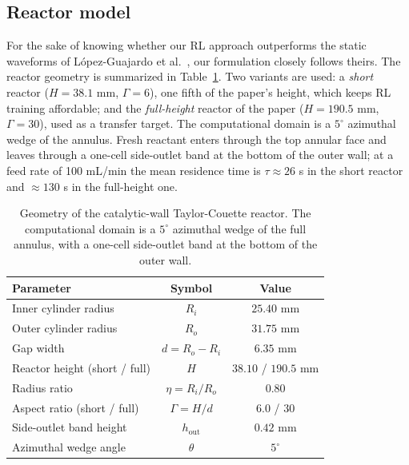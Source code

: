 \documentclass{article}
\begin{document}
\subsection{Reactor model}
For the sake of knowing whether our RL approach outperforms the static
waveforms of L\'opez-Guajardo et al.~\cite{lopez2024process}, our formulation
closely follows theirs. The reactor geometry is summarized in
Table~\ref{tab:geometry}. Two variants are used: a \emph{short} reactor
($H = 38.1$ mm, $\Gamma = 6$), one fifth of the paper's height, which keeps RL
training affordable; and the \emph{full-height} reactor of the paper
($H = 190.5$ mm, $\Gamma = 30$), used as a transfer target. The computational
domain is a $5^\circ$ azimuthal wedge of the annulus. Fresh reactant enters
through the top annular face and leaves through a one-cell side-outlet band at
the bottom of the outer wall; at a feed rate of 100 mL/min the mean residence
time is $\tau \approx 26$ s in the short reactor and $\approx 130$ s in the
full-height one.

\begin{table}[ht]
    \centering
    \caption{Geometry of the catalytic-wall Taylor-Couette reactor. The
    computational domain is a $5^\circ$ azimuthal wedge of the full annulus,
    with a one-cell side-outlet band at the bottom of the outer wall.\newline}\label{tab:geometry}
    \begin{tabular}{lcc}
        \toprule
        Parameter & Symbol & Value \\
        \midrule
        Inner cylinder radius   & $R_i$          & $25.40$ mm \\
        Outer cylinder radius   & $R_o$          & $31.75$ mm \\
        Gap width               & $d = R_o - R_i$ & $6.35$ mm \\
        Reactor height (short / full) & $H$      & $38.10$ / $190.5$ mm \\
        Radius ratio            & $\eta = R_i/R_o$ & $0.80$ \\
        Aspect ratio (short / full) & $\Gamma = H/d$ & $6.0$ / $30$ \\
        Side-outlet band height & $h_\mathrm{out}$ & $0.42$ mm \\
        Azimuthal wedge angle   & $\theta$       & $5^\circ$ \\
        \bottomrule
    \end{tabular}
\end{table}
\end{document}
